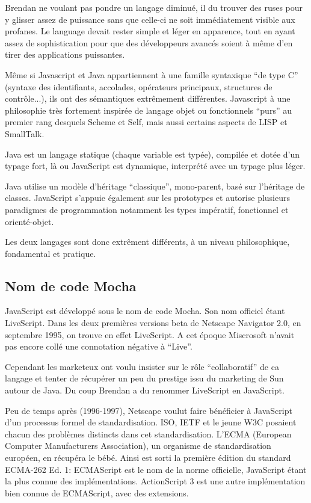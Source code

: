 Brendan ne voulant pas pondre un langage diminué, il du trouver des ruses pour y glisser assez de puissance sans que celle-ci ne soit immédiatement visible aux profanes. Le language devait rester simple et léger en apparence, tout en ayant assez de sophistication pour que des développeurs avancés soient à même d’en tirer des applications puissantes.

Même si Javascript et Java appartiennent à une famille syntaxique “de type C” (syntaxe des identifiants, accolades, opérateurs principaux, structures de contrôle...), ils ont des sémantiques extrêmement différentes. Javascript à une philosophie très fortement inspirée de langage objet ou fonctionnels “purs” au premier rang desquels Scheme et Self, mais aussi certains aspects de LISP et SmallTalk.

Java est un langage statique (chaque variable est typée), compilée et dotée d’un typage fort, là ou JavaScript est dynamique, interprété avec un typage plus léger.

Java utilise un modèle d’héritage “classique”, mono-parent, basé sur l’héritage de classes. JavaScript s'appuie également sur les prototypes et autorise plusieurs paradigmes de programmation notamment les types impératif, fonctionnel et orienté-objet.

Les deux langages sont donc extrêment différents, à un niveau philosophique, fondamental et pratique.

\subsection{Nom de code Mocha}

JavaScript est développé sous le nom de code Mocha. Son nom officiel étant LiveScript. Dans les deux premières versions beta de Netscape Navigator 2.0, en septembre 1995, on trouve en effet LiveScript. A cet époque Miscrosoft n’avait pas encore collé une connotation négative à “Live”.

Cependant les marketeux ont voulu insister sur le rôle “collaboratif” de ca langage et tenter de récupérer un peu du prestige issu du marketing de Sun autour de Java. Du coup Brendan a du renommer LiveScript en JavaScript.

Peu de temps après (1996-1997), Netscape voulut faire bénéficier à JavaScript d’un processus formel de standardisation. ISO, IETF et le jeune W3C posaient chacun des problèmes distincts dans cet standardisation. L’ECMA (European Computer Manufacturers Association), un organisme de standardisation européen, en récupéra le bébé. Ainsi est sorti la première édition du standard ECMA-262 Ed. 1: ECMAScript est le nom de la norme officielle, JavaScript étant la plus connue des implémentations. ActionScript 3 est une autre implémentation bien connue de ECMAScript, avec des extensions.

